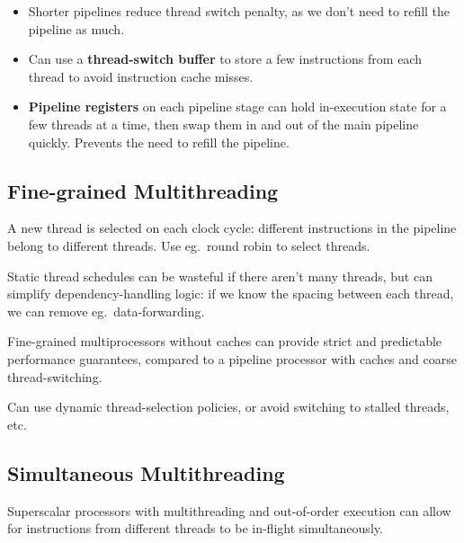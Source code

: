 \documentclass[a4paper, 11pt]{article}
\begin{document}
{{        \begin{itemize}
        \item Shorter pipelines reduce thread switch penalty, as we don't need to refill the pipeline as much.
        \item Can use a \textbf{thread-switch buffer} to store a few instructions from each thread to avoid instruction cache misses. 
        \item \textbf{Pipeline registers} on each pipeline stage can hold in-execution state for a few threads at a time, then swap them in and out of the main pipeline quickly. Prevents the need to refill the pipeline.
        \end{itemize}
    }
    \subsection*{Fine-grained Multithreading}
    {
        A new thread is selected on each clock cycle: different instructions in the pipeline belong to different threads. Use eg.\ round robin to select threads.

        Static thread schedules can be wasteful if there aren't many threads, but can simplify dependency-handling logic: if we know the spacing between each thread, we can remove eg.\ data-forwarding.

        Fine-grained multiprocessors without caches can provide strict and predictable performance guarantees, compared to a pipeline processor with caches and coarse thread-switching.

        Can use dynamic thread-selection policies, or avoid switching to stalled threads, etc.
    }
    \subsection*{Simultaneous Multithreading}
    {
        Superscalar processors with multithreading and out-of-order execution can allow for instructions from different threads to be in-flight simultaneously.
    }
}
\end{document}
